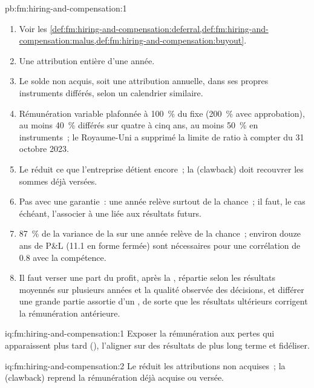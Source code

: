 \begin{solution}{pb:fm:hiring-and-compensation:1}
\begin{enumerate}
\item Voir les \cref{def:fm:hiring-and-compensation:deferral,def:fm:hiring-and-compensation:malus,def:fm:hiring-and-compensation:buyout}.
\item Une attribution entière d'une année.
\item Le solde non acquis, soit une attribution annuelle, dans ses propres instruments différés, selon un calendrier similaire.
\item Rémunération variable plafonnée à 100~\% du fixe (200~\% avec approbation), au moins 40~\% différés sur quatre à cinq ans, au moins 50~\% en instruments~; le Royaume-Uni
a supprimé la limite de ratio à compter du 31 octobre 2023.
\item Le  réduit ce que l'entreprise détient encore~; la  (clawback) doit recouvrer les sommes déjà versées.
\item Pas avec une garantie~: une année relève surtout de la chance~; il faut, le cas échéant, l'associer à une  liée aux résultats futurs.
\item 87~\% de la variance de la  sur une année relève de la chance~; environ douze ans de P\&L (11.1 en forme fermée) sont nécessaires pour une corrélation de 0.8 avec la compétence.
\item Il faut verser une part du profit, après la , répartie selon les résultats moyennés sur plusieurs années et la qualité observée des décisions, et différer une
grande partie assortie d'un , de sorte que les résultats ultérieurs corrigent la rémunération antérieure.
\end{enumerate}
\end{solution}

\begin{solution}{iq:fm:hiring-and-compensation:1}
Exposer la rémunération aux pertes qui apparaissent plus tard (), l'aligner sur des résultats de plus long terme et fidéliser.
\end{solution}

\begin{solution}{iq:fm:hiring-and-compensation:2}
Le  réduit les attributions non acquises~; la  (clawback) reprend la rémunération déjà acquise ou versée.
\end{solution}

